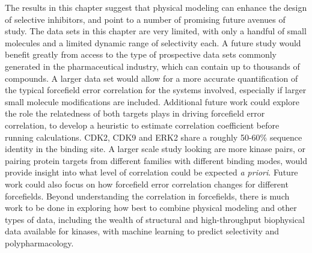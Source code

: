 \documentclass[phd,tocprelim]{cornell}
\begin{document}
The results in this chapter suggest that physical modeling can enhance the design of selective inhibitors, and point to a number of promising future avenues of study. The data sets in this chapter are very limited, with only a handful of small molecules and a limited dynamic range of selectivity each. A future study would benefit greatly from access to the type of prospective data sets commonly generated in the pharmaceutical industry, which can contain up to thousands of compounds. A larger data set would allow for a more accurate quantification of the typical forcefield error correlation for the systems involved, especially if larger small molecule modifications are included.  Additional future work could explore the role the relatedness of both targets plays in driving forcefield error correlation, to develop a heuristic to estimate correlation coefficient before running calculations. CDK2, CDK9 and ERK2 share a roughly 50-60\% sequence identity in the binding site. A larger scale study looking are more kinase pairs, or pairing protein targets from different families with different binding modes, would provide insight into what level of correlation could be expected \emph{a priori}. Future work could also focus on how forcefield  error correlation changes for different forcefields. Beyond understanding the correlation in forcefields, there is much work to be done in exploring how best to combine physical modeling and other types of data, including the wealth of structural and high-throughput biophysical data available for kinases, with machine learning to predict selectivity and polypharmacology. 
\end{document}
